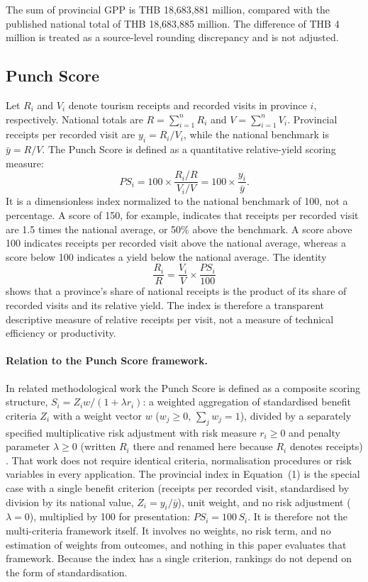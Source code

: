 \documentclass[11pt,a4paper]{article}
\newcommand{\PS}{\mathit{PS}}
\begin{document}
The sum of provincial GPP is THB 18,683,881 million, compared with the published national total of THB 18,683,885 million. The difference of THB 4 million is treated as a source-level rounding discrepancy and is not adjusted.

\subsection{Punch Score}\label{sec:ps}
Let $R_i$ and $V_i$ denote tourism receipts and recorded visits in province $i$, respectively. National totals are $R=\sum_{i=1}^n R_i$ and $V=\sum_{i=1}^n V_i$. Provincial receipts per recorded visit are $y_i=R_i/V_i$, while the national benchmark is $\bar y=R/V$. The Punch Score is defined as a quantitative relative-yield scoring measure:
\begin{equation}
\PS_i=100\times\frac{R_i/R}{V_i/V}=100\times\frac{y_i}{\bar y}.
\end{equation}
It is a dimensionless index normalized to the national benchmark of 100, not a percentage. A score of 150, for example, indicates that receipts per recorded visit are 1.5 times the national average, or 50\% above the benchmark. A score above 100 indicates receipts per recorded visit above the national average, whereas a score below 100 indicates a yield below the national average. The identity
\begin{equation}
\frac{R_i}{R}=\frac{V_i}{V}\times\frac{\PS_i}{100}
\end{equation}
shows that a province's share of national receipts is the product of its share of recorded visits and its relative yield. The index is therefore a transparent descriptive measure of relative receipts per visit, not a measure of technical efficiency or productivity.

\paragraph{Relation to the Punch Score framework.} In related methodological work the Punch Score is defined as a composite scoring structure, $S_i=Z_iw/(1+\lambda r_i)$: a weighted aggregation of standardised benefit criteria $Z_i$ with a weight vector $w$ ($w_j\ge0$, $\sum_j w_j=1$), divided by a separately specified multiplicative risk adjustment with risk measure $r_i\ge0$ and penalty parameter $\lambda\ge0$ (written $R_i$ there and renamed here because $R_i$ denotes receipts) \citep{anon2026b,anon2026}. That work does not require identical criteria, normalisation procedures or risk variables in every application. The provincial index in Equation~(1) is the special case with a single benefit criterion (receipts per recorded visit, standardised by division by its national value, $Z_i=y_i/\bar y$), unit weight, and no risk adjustment ($\lambda=0$), multiplied by 100 for presentation: $\PS_i=100\,S_i$. It is therefore not the multi-criteria framework itself. It involves no weights, no risk term, and no estimation of weights from outcomes, and nothing in this paper evaluates that framework. Because the index has a single criterion, rankings do not depend on the form of standardisation.
\end{document}
